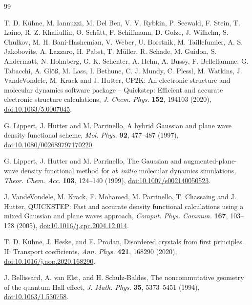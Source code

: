 \begin{thebibliography}{99}
\setlength{\itemsep}{2pt}

T. D. K\"uhne, M. Iannuzzi, M. Del Ben, V. V. Rybkin, P. Seewald,
F. Stein, T. Laino, R. Z. Khaliullin, O. Sch\"utt, F. Schiffmann,
D. Golze, J. Wilhelm, S. Chulkov, M. H. Bani-Hashemian, V. Weber,
U. Borstnik, M. Taillefumier, A. S. Jakobovits, A. Lazzaro, H. Pabst,
T. M\"uller, R. Schade, M. Guidon, S. Andermatt, N. Holmberg,
G. K. Schenter, A. Hehn, A. Bussy, F. Belleflamme, G. Tabacchi,
A. Gl\"o{\ss}, M. Lass, I. Bethune, C. J. Mundy, C. Plessl, M. Watkins,
J. VandeVondele, M. Krack and J. Hutter, CP2K: An electronic structure and
molecular dynamics software package -- Quickstep: Efficient and accurate
electronic structure calculations,
\emph{J. Chem. Phys.} \textbf{152}, 194103 (2020),
\href{https://doi.org/10.1063/5.0007045}{doi:10.1063/5.0007045}.

G. Lippert, J. Hutter and M. Parrinello, A hybrid Gaussian and plane wave
density functional scheme, \emph{Mol. Phys.} \textbf{92}, 477--487 (1997),
\href{https://doi.org/10.1080/002689797170220}{doi:10.1080/002689797170220}.

G. Lippert, J. Hutter and M. Parrinello, The Gaussian and augmented-plane-wave
density functional method for \emph{ab initio} molecular dynamics simulations,
\emph{Theor. Chem. Acc.} \textbf{103}, 124--140 (1999),
\href{https://doi.org/10.1007/s002140050523}{doi:10.1007/s002140050523}.

J. VandeVondele, M. Krack, F. Mohamed, M. Parrinello, T. Chassaing and
J. Hutter, QUICKSTEP: Fast and accurate density functional calculations using
a mixed Gaussian and plane waves approach,
\emph{Comput. Phys. Commun.} \textbf{167}, 103--128 (2005),
\href{https://doi.org/10.1016/j.cpc.2004.12.014}{doi:10.1016/j.cpc.2004.12.014}.

T. D. K\"uhne, J. Heske, and E. Prodan,
Disordered crystals from first principles. II: Transport coefficients,
\emph{Ann. Phys.} \textbf{421}, 168290 (2020),
\href{https://doi.org/10.1016/j.aop.2020.168290}{doi:10.1016/j.aop.2020.168290}.

J. Bellissard, A. van Elst, and H. Schulz-Baldes,
The noncommutative geometry of the quantum Hall effect,
\emph{J. Math. Phys.} \textbf{35}, 5373--5451 (1994),
\href{https://doi.org/10.1063/1.530758}{doi:10.1063/1.530758}.


\end{thebibliography}
